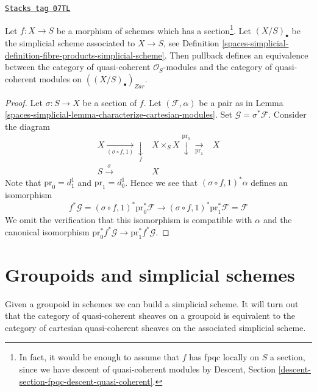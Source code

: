 \begin{lemma}
\label{spaces-simplicial-lemma-cartesian-modules-with-section}
\href{https://stacks.math.columbia.edu/tag/07TL}{\texttt{Stacks tag 07TL}}

Let $f : X \to S$ be a morphism of schemes which has a
section\footnote{In fact, it would be enough to assume that $f$
has fpqc locally on $S$ a section, since we have descent of
quasi-coherent modules by Descent,
Section \ref{descent-section-fpqc-descent-quasi-coherent}.}.
Let $(X/S)_\bullet$ be the simplicial
scheme associated to $X \to S$, see
Definition \ref{spaces-simplicial-definition-fibre-products-simplicial-scheme}.
Then pullback defines an equivalence between the category of
quasi-coherent $\mathcal{O}_S$-modules and the category of
quasi-coherent modules on $((X/S)_\bullet)_{Zar}$.
\end{lemma}

\begin{proof}
Let $\sigma : S \to X$ be a section of $f$. Let $(\mathcal{F}, \alpha)$
be a pair as in Lemma \ref{spaces-simplicial-lemma-characterize-cartesian-modules}.
Set $\mathcal{G} = \sigma^*\mathcal{F}$. Consider the diagram
$$
\begin{array}{ccc}X \underset{(\sigma \circ f, 1)}{\longrightarrow}\underset{f}{\downarrow} & X \times_S X \overset{\text{pr}_0}{\downarrow}\underset{\text{pr}_1}{\longrightarrow} & X \\ S \overset{\sigma}{\longrightarrow} & X & \end{array}
$$
Note that $\text{pr}_0 = d^1_1$ and $\text{pr}_1 = d^1_0$. Hence we
see that $(\sigma \circ f, 1)^*\alpha$ defines an isomorphism
$$
f^*\mathcal{G} = (\sigma \circ f, 1)^*\text{pr}_0^*\mathcal{F}
\longrightarrow
(\sigma \circ f, 1)^*\text{pr}_1^*\mathcal{F} = \mathcal{F}
$$
We omit the verification that this isomorphism is compatible
with $\alpha$ and the canonical isomorphism
$\text{pr}_0^*f^*\mathcal{G} \to \text{pr}_1^*f^*\mathcal{G}$.
\end{proof}

\section{Groupoids and simplicial schemes}
\label{spaces-simplicial-section-groupoids-simplicial}
Given a groupoid in schemes we can build a simplicial scheme.
It will turn out that the category of quasi-coherent sheaves on a
groupoid is equivalent to the category of cartesian quasi-coherent
sheaves on the associated simplicial scheme.

